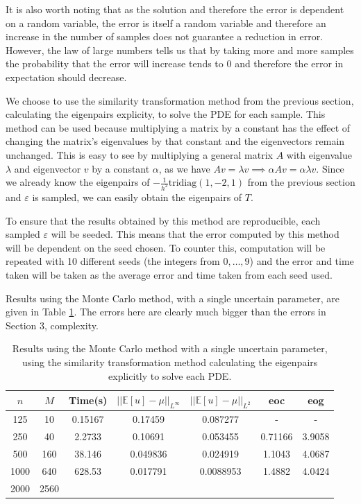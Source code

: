 \documentclass[11pt]{article}
\numberwithin{equation}{section}
\begin{document}
It is also worth noting that as the solution and therefore the error is dependent on a random variable, the error is itself a random variable and therefore an increase in the number of samples does not guarantee a reduction in error. However, the law of large numbers tells us that by taking more and more samples the probability that the error will increase tends to 0 and therefore the error in expectation should decrease.

We choose to use the similarity transformation method from the previous section, calculating the eigenpairs explicity, to solve the PDE for each sample. This method can be used because multiplying a matrix by a constant has the effect of changing the matrix's eigenvalues by that constant and the eigenvectors remain unchanged. This is easy to see by multiplying a general matrix $A$ with eigenvalue $\lambda$ and eigenvector $v$ by a constant $\alpha$, as we have $Av = \lambda v \implies \alpha A v = \alpha \lambda v$. Since we already know the eigenpairs of $-\frac{1}{h^2} \text{tridiag}(1,-2,1)$ from the previous section and $\varepsilon$ is sampled, we can easily obtain the eigenpairs of $T$. 

To ensure that the results obtained by this method are reproducible, each sampled $\varepsilon$ will be seeded. This means that the error computed by this method will be dependent on the seed chosen. To counter this, computation will be repeated with 10 different seeds (the integers from $0, \dots, 9$) and the error and time taken will be taken as the average error and time taken from each seed used.

Results using the Monte Carlo method, with a single uncertain parameter, are given in Table \ref{table:monte carlo}. The errors here are clearly much bigger than the errors in Section 3,  complexity.
\begin{table}[H]
\centering
\begin{tabular}{|c|c|c|c|c|c|c|}
\hline
$n$ & $M$ & Time(s) & $|| \mathbb{E}[u] - \mu ||_{L^{\infty}}$ & $|| \mathbb{E}[u] - \mu ||_{L^{2}}$ & eoc & eog \\
\hline
125 & 10 & 0.15167 & 0.17459 & 0.087277 & - & - \\
250 & 40 & 2.2733 & 0.10691 & 0.053455 & 0.71166 & 3.9058 \\
500 & 160 & 38.146 & 0.049836 & 0.024919 & 1.1043 & 4.0687 \\
1000 & 640 & 628.53 & 0.017791 & 0.0088953 & 1.4882 & 4.0424 \\
2000 & 2560 &  &  &  &  &  \\
\hline
\end{tabular}
\captionsetup{justification=centering}
\caption{Results using the Monte Carlo method with a single uncertain parameter, using the similarity transformation method calculating the eigenpairs explicitly to solve each PDE.}
\label{table:monte carlo}
\end{table}
\end{document}
